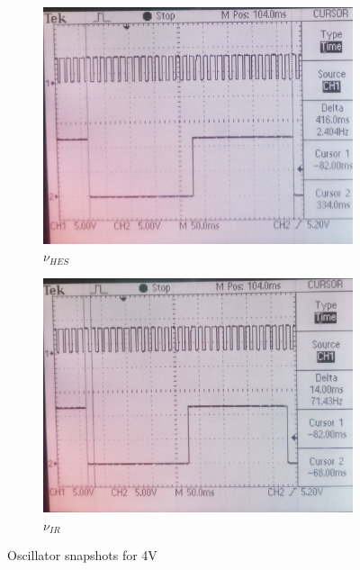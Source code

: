 \documentclass[12pt]{article}
\begin{document}
\begin{figure}[H]
	\begin{subfigure}[b]{0.5\linewidth}		
		\includegraphics[width = \linewidth, trim = {0 0 0 0}, clip]{HES4V.jpg}
		\caption{\( \nu_{HES} \)}
	\end{subfigure}
	\begin{subfigure}[b]{0.5\linewidth}						
		\includegraphics[width = \linewidth, trim = {0 0 0 0}, clip]{IR4V.jpg}
		\caption{\( \nu_{IR} \)}
	\end{subfigure}
	\caption{Oscillator snapshots for 4V}
\end{figure}
\end{document}
